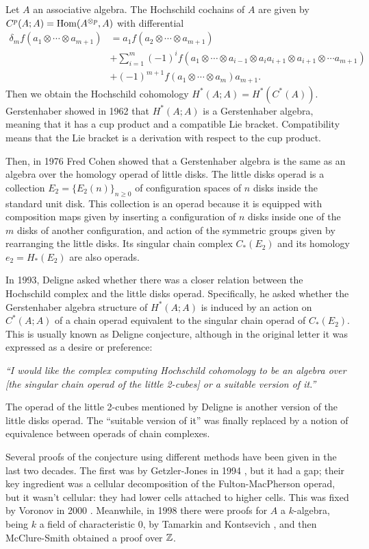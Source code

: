 \documentclass[TFM.tex]{subfiles}
\begin{document}

Let $A$ an associative algebra. The Hochschild cochains of $A$ are given by $C^p(A;A)=\operatorname{Hom}(A^{\otimes p},A)$ with differential 
\begin{align*}
\delta_m f(a_1\otimes\cdots\otimes a_{m+1})&=a_1f(a_2\otimes\cdots\otimes a_{m+1})\\
& +\sum_{i=1}^m(-1)^if(a_1\otimes\cdots\otimes a_{i-1}\otimes a_ia_{i+1}\otimes a_{i+1}\otimes\cdots a_{m+1})\\
& +(-1)^{m+1}f(a_1\otimes\cdots\otimes a_m)a_{m+1}.
\end{align*}
Then we obtain the Hochschild cohomology $H^*(A;A)=H^*(C^*(A))$. Gerstenhaber showed in 1962 \cite{Gerstenhaber} that $H^*(A;A)$ is a Gerstenhaber algebra, meaning that it has a cup product and a compatible Lie bracket. Compatibility means that the Lie bracket is a derivation with respect to the cup product.

Then, in 1976 Fred Cohen \cite{cuentas} showed that a Gerstenhaber algebra is the same as an algebra over the homology operad of little disks. The little disks operad is a collection $E_2=\{E_2(n)\}_{n\geq 0}$ of configuration spaces of $n$ disks inside the standard unit disk. This collection is an operad because it is equipped with composition maps given by inserting a configuration of $n$ disks inside one of the $m$ disks of another configuration, and action of the symmetric groups given by rearranging the little disks. Its singular chain complex $C_*(E_2)$ and its homology $e_2=H_*(E_2)$ are also operads. 

In 1993, Deligne asked \cite{deligne} whether there was a closer relation between the Hochschild complex and the little disks operad. Specifically, he asked whether the Gerstenhaber algebra structure of $H^*(A;A)$ is induced by an action on $C^*(A;A)$ of a chain operad
equivalent to the singular chain operad of $C_*(E_2)$. This is usually known as Deligne conjecture, although in the original letter it was expressed as a desire or preference:

\emph{``I would
like the complex computing Hochschild cohomology to be an algebra over [the singular chain
operad of the little 2-cubes] or a suitable version of it.''}

The operad of the little 2-cubes mentioned by Deligne is another version of the little disks operad. The ``suitable version of it'' was finally replaced by a notion of equivalence between operads of chain complexes.

Several proofs of the conjecture using different methods have been given in the last two decades. The first was by Getzler-Jones in 1994 \cite{GJ}, but it had a gap; their key ingredient was a cellular decomposition of the Fulton-MacPherson operad, but it wasn’t cellular: they had
lower cells attached to higher cells. This was fixed by Voronov in 2000 \cite{VO}. Meanwhile, in 1998 there were proofs for $A$ a $k$-algebra, being $k$ a field of characteristic 0, by Tamarkin and Kontsevich \cite{tk}, and then McClure-Smith \cite{McClure} obtained a proof over $\mathbb{Z}$.
\end{document}
